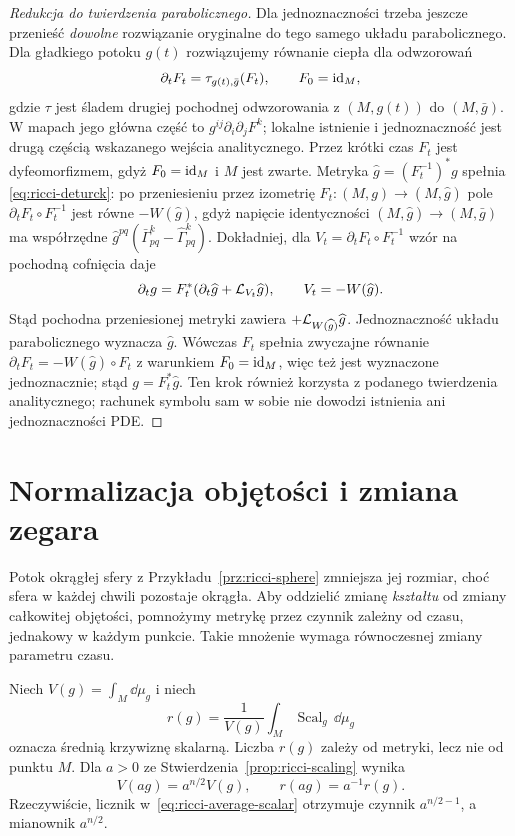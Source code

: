 \begin{proof}[Redukcja do twierdzenia parabolicznego]
Dla jednoznaczności trzeba jeszcze przenieść
\emph{dowolne} rozwiązanie oryginalne do tego samego
układu parabolicznego. Dla gładkiego potoku $g(t)$
rozwiązujemy równanie ciepła dla odwzorowań
\[
 \partial_tF_t=\tau_{g(t),\bar g}(F_t),
 \qquad F_0=\mathrm{id}_M,
\]
gdzie $\tau$ jest śladem drugiej pochodnej
odwzorowania z $(M,g(t))$ do $(M,\bar g)$.
W mapach jego główna część to
$g^{ij}\partial_i\partial_jF^k$; lokalne istnienie
i jednoznaczność jest drugą częścią wskazanego
wejścia analitycznego. Przez krótki czas $F_t$ jest
dyfeomorfizmem, gdyż $F_0=\mathrm{id}_M$ i $M$ jest zwarte.
Metryka $\widehat g=(F_t^{-1})^*g$ spełnia
\eqref{eq:ricci-deturck}: po przeniesieniu przez
izometrię $F_t:(M,g)\to(M,\widehat g)$ pole
$\partial_tF_t\circ F_t^{-1}$ jest równe
$-W(\widehat g)$, gdyż napięcie identyczności
$(M,\widehat g)\to(M,\bar g)$ ma współrzędne
$\widehat g^{pq}(\bar\Gamma^k_{pq}
-\widehat\Gamma^k_{pq})$.
Dokładniej, dla $V_t=\partial_tF_t\circ F_t^{-1}$
wzór na pochodną cofnięcia daje
\[
 \partial_tg=F_t^*(\partial_t\widehat g
                       +\mathcal L_{V_t}\widehat g),
 \qquad V_t=-W(\widehat g).
\]
Stąd pochodna przeniesionej metryki zawiera
$+\mathcal L_{W(\widehat g)}\widehat g$.
Jednoznaczność układu parabolicznego wyznacza
$\widehat g$. Wówczas $F_t$ spełnia zwyczajne
równanie $\partial_tF_t=-W(\widehat g)\circ F_t$
z warunkiem $F_0=\mathrm{id}_M$, więc też jest wyznaczone
jednoznacznie; stąd $g=F_t^*\widehat g$.
Ten krok również
korzysta z podanego twierdzenia analitycznego;
rachunek symbolu sam w sobie nie dowodzi istnienia
ani jednoznaczności PDE.
\end{proof}

\section{Normalizacja objętości i zmiana zegara}
\label{sec:ricci-normalized}

Potok okrągłej sfery z Przykładu~\ref{prz:ricci-sphere}
zmniejsza jej rozmiar, choć sfera w każdej chwili pozostaje
okrągła. Aby oddzielić zmianę \emph{kształtu} od zmiany
całkowitej objętości, pomnożymy metrykę przez czynnik zależny
od czasu, jednakowy w każdym punkcie. Takie mnożenie wymaga
równoczesnej zmiany parametru czasu.

Niech $V(g)=\int_M\dd\mu_g$ i niech
\begin{equation}\label{eq:ricci-average-scalar}
 r(g)=\frac{1}{V(g)}\int_M\operatorname{Scal}_g\,\dd\mu_g
\end{equation}
oznacza średnią krzywiznę skalarną. Liczba $r(g)$ zależy
od metryki, lecz nie od punktu $M$. Dla $a>0$ ze
Stwierdzenia~\ref{prop:ricci-scaling} wynika
\begin{equation}\label{eq:ricci-average-scaling}
 V(ag)=a^{n/2}V(g),\qquad r(ag)=a^{-1}r(g).
\end{equation}
Rzeczywiście, licznik w~\eqref{eq:ricci-average-scalar}
otrzymuje czynnik $a^{n/2-1}$, a mianownik $a^{n/2}$.

